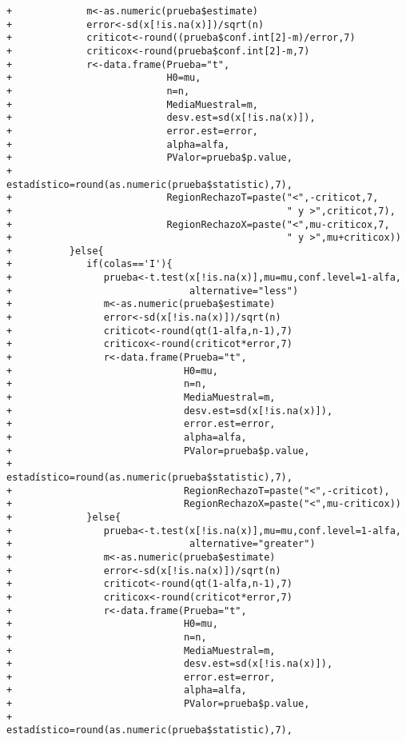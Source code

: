 \begin{solucion}
\begin{verbatim}
+             m<-as.numeric(prueba$estimate)
+             error<-sd(x[!is.na(x)])/sqrt(n)
+             criticot<-round((prueba$conf.int[2]-m)/error,7)
+             criticox<-round(prueba$conf.int[2]-m,7)
+             r<-data.frame(Prueba="t",
+                           H0=mu,
+                           n=n,
+                           MediaMuestral=m,
+                           desv.est=sd(x[!is.na(x)]),
+                           error.est=error,
+                           alpha=alfa,
+                           PValor=prueba$p.value,
+                           estadístico=round(as.numeric(prueba$statistic),7),
+                           RegionRechazoT=paste("<",-criticot,7,
+                                                " y >",criticot,7),
+                           RegionRechazoX=paste("<",mu-criticox,7,
+                                                " y >",mu+criticox))
+          }else{
+             if(colas=='I'){
+                prueba<-t.test(x[!is.na(x)],mu=mu,conf.level=1-alfa,
+                               alternative="less")
+                m<-as.numeric(prueba$estimate)
+                error<-sd(x[!is.na(x)])/sqrt(n)
+                criticot<-round(qt(1-alfa,n-1),7)
+                criticox<-round(criticot*error,7)
+                r<-data.frame(Prueba="t",
+                              H0=mu,
+                              n=n,
+                              MediaMuestral=m,
+                              desv.est=sd(x[!is.na(x)]),
+                              error.est=error,
+                              alpha=alfa,
+                              PValor=prueba$p.value,
+                              estadístico=round(as.numeric(prueba$statistic),7),
+                              RegionRechazoT=paste("<",-criticot),
+                              RegionRechazoX=paste("<",mu-criticox))
+             }else{
+                prueba<-t.test(x[!is.na(x)],mu=mu,conf.level=1-alfa,
+                               alternative="greater")
+                m<-as.numeric(prueba$estimate)
+                error<-sd(x[!is.na(x)])/sqrt(n)
+                criticot<-round(qt(1-alfa,n-1),7)
+                criticox<-round(criticot*error,7)
+                r<-data.frame(Prueba="t",
+                              H0=mu,
+                              n=n,
+                              MediaMuestral=m,
+                              desv.est=sd(x[!is.na(x)]),
+                              error.est=error,
+                              alpha=alfa,
+                              PValor=prueba$p.value,
+                              estadístico=round(as.numeric(prueba$statistic),7),

\end{verbatim}
\end{solucion}
